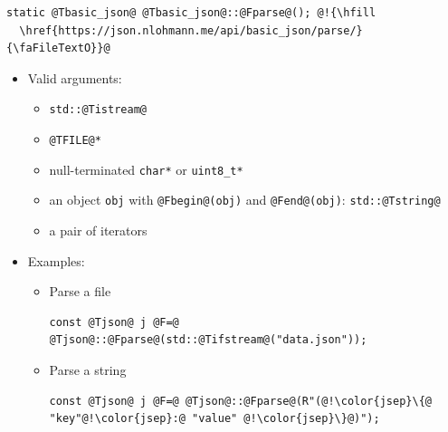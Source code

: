 \documentclass{slides}
\makeatletter
\newcommand{\@slidetitle}{}
\newcommand{\slidetitle}[1]{\renewcommand{\@slidetitle}{#1}}
\makeatother
\begin{document}
\pagebreak
\slidetitle{Parsing}

\begin{tcolorbox}
\begin{lstlisting}
static @Tbasic_json@ @Tbasic_json@::@Fparse@(); @!{\hfill
  \href{https://json.nlohmann.me/api/basic_json/parse/}{\faFileTextO}}@
\end{lstlisting}
\end{tcolorbox}
\vspace{0em}

\begin{itemize}[itemsep=0.5em]
  \item Valid arguments:
    \begin{itemize}
      \item \lstinline{std::@Tistream@}
      \item \lstinline{@TFILE@*}
      \item null-terminated \lstinline{char*} or \lstinline{uint8_t*}
      \item an object \lstinline{obj} with \lstinline{@Fbegin@(obj)} and
        \lstinline{@Fend@(obj)}: \lstinline{std::@Tstring@}
      \item a pair of iterators
    \end{itemize}

  \item Examples:
    \begin{itemize}
      \item Parse a file
        \vspace{-0.5em}
        \begin{tcolorbox}{\F{16pt}
        \begin{lstlisting}
const @Tjson@ j @F=@ @Tjson@::@Fparse@(std::@Tifstream@("data.json"));
        \end{lstlisting}
        }\end{tcolorbox}

      \item Parse a string
        \vspace{-0.5em}
        \begin{tcolorbox}{\F{16pt}
        \begin{lstlisting}
const @Tjson@ j @F=@ @Tjson@::@Fparse@(R"(@!\color{jsep}\{@ "key"@!\color{jsep}:@ "value" @!\color{jsep}\}@)");
        \end{lstlisting}
        }\end{tcolorbox}
    \end{itemize}
\end{itemize}
\vspace{-1em}
\end{document}

